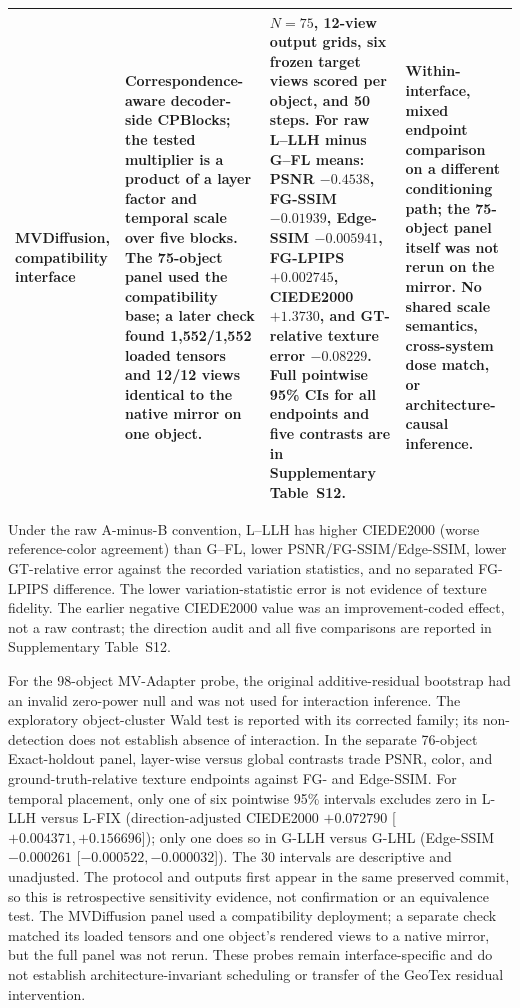 \documentclass[times,twocolumn,final]{elsarticle}
\begin{document}
\begin{table}[t]
\begin{tabular}{p{2.4cm}p{4.0cm}p{4.2cm}p{4.5cm}}
MVDiffusion, compatibility interface &
Correspondence-aware decoder-side CPBlocks; the tested multiplier is a product of a layer factor and temporal scale over five blocks. The 75-object panel used the compatibility base; a later check found 1,552/1,552 loaded tensors and 12/12 views identical to the native mirror on one object. &
$N=75$, 12-view output grids, six frozen target views scored per object, and 50 steps. For raw L--LLH minus G--FL means: PSNR $-0.4538$, FG-SSIM $-0.01939$, Edge-SSIM $-0.005941$, FG-LPIPS $+0.002745$, CIEDE2000 $+1.3730$, and GT-relative texture error $-0.08229$. Full pointwise 95\% CIs for all endpoints and five contrasts are in Supplementary Table~S12. &
Within-interface, mixed endpoint comparison on a different conditioning path; the 75-object panel itself was not rerun on the mirror. No shared scale semantics, cross-system dose match, or architecture-causal inference. \\
\bottomrule
\end{tabular}
\end{table}

Under the raw A-minus-B convention, L--LLH has higher CIEDE2000 (worse reference-color agreement) than G--FL, lower PSNR/FG-SSIM/Edge-SSIM, lower GT-relative error against the recorded variation statistics, and no separated FG-LPIPS difference. The lower variation-statistic error is not evidence of texture fidelity. The earlier negative CIEDE2000 value was an improvement-coded effect, not a raw contrast; the direction audit and all five comparisons are reported in Supplementary Table~S12.

For the 98-object MV-Adapter probe, the original additive-residual bootstrap had an invalid zero-power null and was not used for interaction inference. The exploratory object-cluster Wald test is reported with its corrected family; its non-detection does not establish absence of interaction. In the separate 76-object Exact-holdout panel, layer-wise versus global contrasts trade PSNR, color, and ground-truth-relative texture endpoints against FG- and Edge-SSIM. For temporal placement, only one of six pointwise 95\% intervals excludes zero in L-LLH versus L-FIX (direction-adjusted CIEDE2000 $+0.072790$ [$+0.004371,+0.156696$]); only one does so in G-LLH versus G-LHL (Edge-SSIM $-0.000261$ [$-0.000522,-0.000032$]). The 30 intervals are descriptive and unadjusted. The protocol and outputs first appear in the same preserved commit, so this is retrospective sensitivity evidence, not confirmation or an equivalence test. The MVDiffusion panel used a compatibility deployment; a separate check matched its loaded tensors and one object's rendered views to a native mirror, but the full panel was not rerun. These probes remain interface-specific and do not establish architecture-invariant scheduling or transfer of the GeoTex residual intervention.
\end{document}
